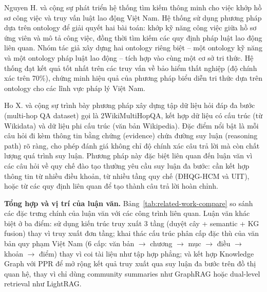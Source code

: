 Nguyen H. và cộng sự \cite{nguyen2024intelligent} phát triển hệ thống tìm kiếm thông
minh cho việc khớp hồ sơ công việc và truy vấn luật lao động Việt Nam. Hệ thống sử
dụng phương pháp dựa trên ontology để giải quyết hai bài toán: khớp kỹ năng
công việc giữa hồ sơ ứng viên và mô tả công việc, đồng thời tìm kiếm các quy định
pháp luật lao động liên quan. Nhóm tác giả xây dựng hai ontology riêng biệt -- một
ontology kỹ năng và một ontology pháp luật lao động -- tích hợp vào cùng một cơ sở
tri thức. Hệ thống đạt kết quả tốt nhất trên các truy vấn về bảo hiểm thất nghiệp
(độ chính xác trên 70\%), chứng minh hiệu quả của phương pháp biểu diễn tri thức
dựa trên ontology cho các lĩnh vực pháp lý Việt Nam.

Ho X. và cộng sự \cite{ho2020constructing} trình bày phương pháp xây dựng tập dữ liệu
hỏi đáp đa bước (multi-hop QA dataset) gọi là 2WikiMultiHopQA, kết hợp dữ liệu có
cấu trúc (từ Wikidata) và dữ liệu phi cấu trúc (văn bản Wikipedia). Đặc điểm nổi
bật là mỗi câu hỏi đi kèm thông tin bằng chứng (evidence) chứa đường suy luận
(reasoning path) rõ ràng, cho phép đánh giá không chỉ độ chính xác câu trả lời mà
còn chất lượng quá trình suy luận. Phương pháp này đặc biệt liên quan đến luận văn
vì các câu hỏi về quy chế đào tạo thường yêu cầu suy luận đa bước: cần kết hợp
thông tin từ nhiều điều khoản, từ nhiều tầng quy chế (ĐHQG-HCM và UIT), hoặc từ
các quy định liên quan để tạo thành câu trả lời hoàn chỉnh.

\vspace{0.5em}
\noindent\textbf{Tổng hợp và vị trí của luận văn.} Bảng~\ref{tab:related-work-compare}
so sánh các đặc trưng chính của luận văn với các công trình liên quan. Luận văn khác
biệt ở ba điểm: sử dụng kiến trúc truy xuất 3 tầng (duyệt cây + semantic + KG
fusion) thay vì truy xuất đơn tầng; khai thác cấu trúc phân cấp đặc thù của
văn bản quy phạm Việt Nam (6 cấp: văn bản $\rightarrow$ chương $\rightarrow$ mục
$\rightarrow$ điều $\rightarrow$ khoản $\rightarrow$ điểm) thay vì coi tài liệu như
tập hợp phẳng; và kết hợp Knowledge Graph với PPR để mở rộng kết quả truy xuất
qua suy luận đa bước trên đồ thị quan hệ, thay vì chỉ dùng community summaries
như GraphRAG hoặc dual-level retrieval như LightRAG.


